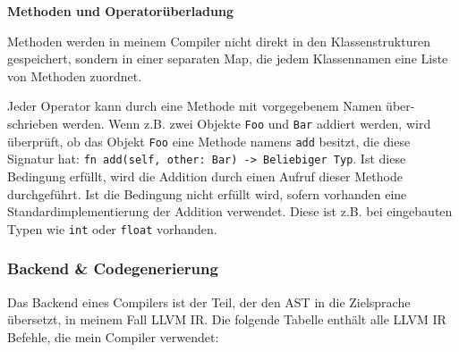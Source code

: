         \begin{center}
            \textbf{Methoden und Operatorüberladung}
        \end{center}

        Methoden werden in meinem Compiler nicht direkt in den Klassenstrukturen gespeichert, sondern in 
        einer separaten Map, die jedem Klassennamen eine Liste von Methoden zuordnet.

        Jeder Operator kann durch eine Methode mit vorgegebenem Namen über-schrieben werden.
        Wenn z.B. zwei Objekte \texttt{Foo} und \texttt{Bar} addiert werden, wird überprüft, ob
        das Objekt \texttt{Foo} eine Methode namens \texttt{add} besitzt, die diese Signatur hat:
        \texttt{fn add(self, other: Bar) -> Beliebiger Typ}.
        Ist diese Bedingung erfüllt, wird die Addition durch einen Aufruf dieser Methode durchgeführt.
        Ist die Bedingung nicht erfüllt wird, sofern vorhanden eine Standardimplementierung der Addition 
        verwendet. Diese ist z.B. bei eingebauten Typen wie \texttt{int} oder \texttt{float} vorhanden.

        \subsubsection{Backend \& Codegenerierung}

        Das Backend eines Compilers ist der Teil, der den AST in die Zielsprache übersetzt, in meinem Fall LLVM IR.
        Die folgende Tabelle enthält alle LLVM IR Befehle, die mein Compiler verwendet:

